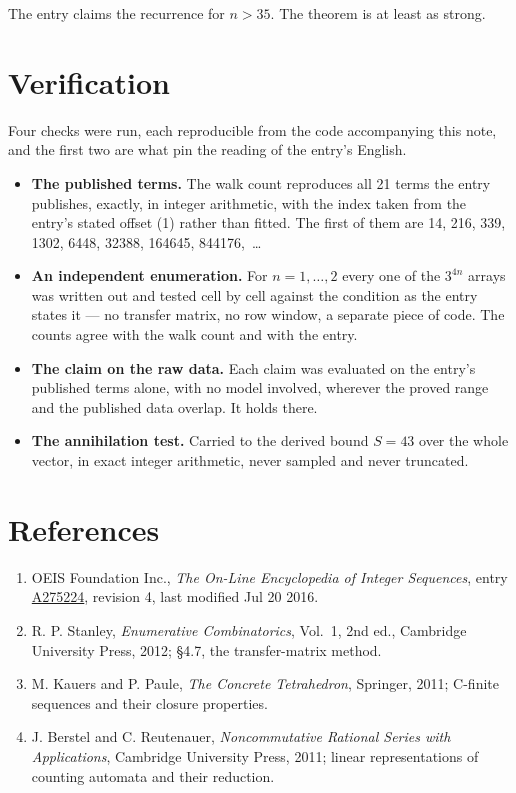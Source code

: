 \documentclass[11pt]{article}
\theoremstyle{definition}
\begin{document}
The entry claims the recurrence for $n > 35$. The theorem is at least as strong.

\section{Verification}

Four checks were run, each reproducible from the code accompanying this note, and the first two are what pin the reading of the entry's English.

\begin{itemize}

\item {\bfseries The published terms.} The walk count reproduces all 21 terms the entry publishes, exactly, in integer arithmetic, with the index taken from the entry's stated offset (1) rather than fitted. The first of them are 14, 216, 339, 1302, 6448, 32388, 164645, 844176,~\dots

\item {\bfseries An independent enumeration.} For $n = 1,\dots,2$ every one of the $3^{4n}$ arrays was written out and tested cell by cell against the condition as the entry states it --- no transfer matrix, no row window, a separate piece of code. The counts agree with the walk count and with the entry.

\item {\bfseries The claim on the raw data.} Each claim was evaluated on the entry's published terms alone, with no model involved, wherever the proved range and the published data overlap. It holds there.

\item {\bfseries The annihilation test.} Carried to the derived bound $S = 43$ over the whole vector, in exact integer arithmetic, never sampled and never truncated.

\end{itemize}

\section{References}

\begin{enumerate}

\item OEIS Foundation Inc., \emph{The On-Line Encyclopedia of Integer Sequences}, entry \href{https://oeis.org/A275224}{A275224}, revision 4, last modified Jul 20 2016.

\item R. P. Stanley, \emph{Enumerative Combinatorics}, Vol.~1, 2nd ed., Cambridge University Press, 2012; \S4.7, the transfer-matrix method.

\item M. Kauers and P. Paule, \emph{The Concrete Tetrahedron}, Springer, 2011; C-finite sequences and their closure properties.

\item J. Berstel and C. Reutenauer, \emph{Noncommutative Rational Series with Applications}, Cambridge University Press, 2011; linear representations of counting automata and their reduction.

\end{enumerate}
\end{document}
